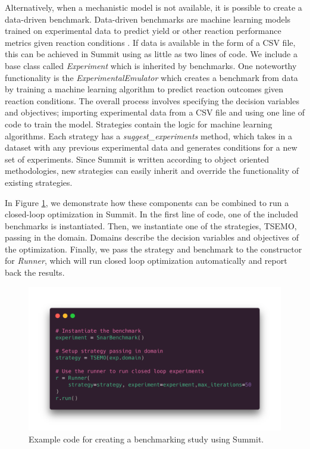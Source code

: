 Alternatively, when a mechanistic model is not available, it is possible to create a data-driven benchmark. Data-driven benchmarks are machine learning models trained on experimental data to predict yield or other reaction performance metrics given reaction conditions \cite{Hase2020a}.  If data is available in the form of a CSV file, this can be achieved in Summit using as little as two lines of code. We include a base class called \textit{Experiment} which is inherited by benchmarks. One noteworthy functionality is the \textit{ExperimentalEmulator} which creates a benchmark from data by training a machine learning algorithm to predict reaction outcomes given reaction conditions. The overall process involves specifying the decision variables and objectives; importing experimental data from a CSV file and using one line of code to train the model. Strategies contain the logic for machine learning algorithms. Each strategy has a \textit{suggest\_experiments} method, which takes in a dataset with any previous experimental data and generates conditions for a new set of experiments.  Since Summit is written according to object oriented methodologies, new strategies can easily inherit and override the functionality of existing strategies.

In Figure \ref{fig:code_example}, we demonstrate how these components can be combined to run a closed-loop optimization in Summit. In the first line of code, one of the included benchmarks is instantiated. Then, we instantiate one of the strategies, TSEMO, passing in the domain. Domains describe the decision variables and objectives of the optimization. Finally, we pass the strategy and benchmark to the constructor for \textit{Runner}, which will run closed loop optimization automatically and report back the results. 

\begin{figure}
    \centering
    \includegraphics[width=\textwidth]{gfx/Chapter03/paraiso.png}
    \caption{Example code for creating a benchmarking study using Summit.}
    \label{fig:code_example}
\end{figure}

